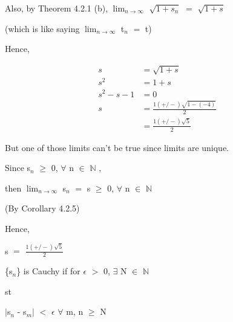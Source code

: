 \documentclass{article}
\newcommand{\mt}[1]{\ensuremath{#1}}
\newcommand{\bn}{\mt{\mathbb{N}} }       %
\newcommand{\ep}{\mt{\epsilon} }         %
\newcommand{\fa}{\mt{\forall} }          %
\newcommand{\mem}{\mt{\in} }
\newcommand{\exs}{\mt{\exists} }
\newcommand{\av}[1]{\mt{|}#1\mt{|}}  %
\newcommand{\bk}[1]{\{#1\}}
\newcommand{\ls}{\mt{<} }
\newcommand{\gr}{\mt{>} }
\newcommand{\gre}{\mt{\geq} }
\newcommand{\eql}{\mt{=} }
\newcommand{\uw}[2]{#1\mt{_{#2}}}
\newcommand{\lmti}[1]{\mt{\displaystyle{\lim_{#1 \to \infty}}}}
\newcommand{\eqn}[1]{\[#1\]}
\newcommand{\splt}[1]{\begin{split}#1\end{split}}
\begin{document}
{Also, by Theorem 4.2.1 (b), \lmti{n} $\sqrt{1 + s_n}$ \eql $\sqrt{1 + s}$

(which is like saying \lmti{n} \uw{t}{n} \eql t)

Hence,

\eqn{
	\splt{
		s & = \sqrt{1 + s} \\
		s^2 & = 1 + s \\
		s^2 - s - 1 & = 0 \\
		s & = \frac{1 (+/-) \sqrt{1 - (-4)}}{2} \\
		& = \frac{1 (+/-) \sqrt{5}}{2} 
	}
}

But one of those limits can't be true since limits are unique.

Since \uw{s}{n} \gre 0, \fa n \mem \bn,

then \lmti{n} \uw{s}{n} \eql s \gre 0, \fa n \mem \bn 

(By Corollary 4.2.5)

Hence, 

s \eql $\frac{1 (+/-) \sqrt{5}}{2}$

\bk{\uw{s}{n}} is Cauchy if for \ep \gr 0, \exs N \mem \bn

st

\av{\uw{s}{n} - \uw{s}{m}} \ls \ep \fa m, n \gre N

}
\end{document}
